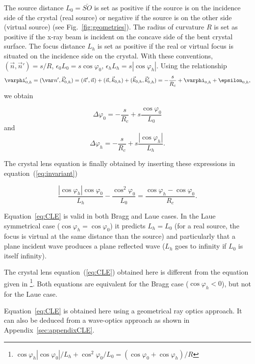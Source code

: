 \documentclass[preprint]{iucr}              %
\newcommand{\inblue}[1]{{\color{black}#1}}
\begin{document}
The source distance $L_0=\bar{SO}$ is set as positive if the source is on the incidence side of the crystal (real source) or negative if the source is on the other side (virtual source) (see Fig.~\ref{fig:geometries}). The radius of curvature $R$ is set as positive if the x-ray beam is incident on the concave side of the bent crystal surface. The focus distance $L_h$ is set as positive if the real or virtual focus is situated on the incidence side on the crystal. With these conventions, $(\vec n,\vec n')=s/R$, $\epsilon_0 L_0 = s \cos\varphi_0$,  $\epsilon_h L_h = s |\cos\varphi_h|$. Using the relationship
\begin{equation}
    \varphi'_{0,h} = 
    (\var n',  \vec k'_{0,h}) = 
    (\vec n', \vec n) + (\vec n,\vec k_{0,h}) + (\vec k_{0,h}, \vec k'_{0,h}) = -\frac{s}{R_c} + \varphi_{0,h} + \epsilon_{0,h},
\end{equation}
we obtain

\begin{equation}
\label{eq:angles}
\Delta \varphi_0 =  - \frac{s}{R_c} + s \frac{\cos\varphi_0}{L_0}
\end{equation}
and 
\begin{equation}
\label{eq:angles2}
\Delta \varphi_h = - \frac{s}{R_c} +  s \frac{|\cos\varphi_h|}{L_h}.
\end{equation}

The crystal lens equation is finally obtained by inserting these expressions in equation~(\ref{eq:invariant})

\begin{equation}
\label{eq:CLE}
\frac{|\cos\varphi_h| \cos\varphi_0}{L_h} - \frac{\cos^2\varphi_0}{L_0} = \frac{\cos\varphi_h - \cos\varphi_0}{R_c}.
\end{equation}


Equation~\ref{eq:CLE} is valid in both Bragg and Laue cases. In the Laue symmetrical case ($\cos\varphi_h=\cos\varphi_0$) it predicts $L_h=L_0$ \inblue{(for a real source, the focus is virtual at the same distance than the source)} and particularly that a plane incident wave produces a plane reflected wave ($L_h$ goes to infinity if $L_0$ is itself infinity).

The crystal lens equation~(\ref{eq:CLE}) obtained here is different from the equation given in \cite{CK}\footnote{ 
$
\cos\varphi_h |\cos\varphi_0|/L_h + \cos^2\varphi_0/L_0 = (\cos\varphi_0 + \cos\varphi_h)/R 
$}. Both equations are equivalent for the Bragg case ($\cos\varphi_h<0$), but not for the Laue case.

Equation~\ref{eq:CLE} is obtained here using a geometrical ray optics approach. It can also be deduced from a \inblue{wave-optics} approach as shown in Appendix~\ref{sec:appendixCLE}. 
\end{document}
